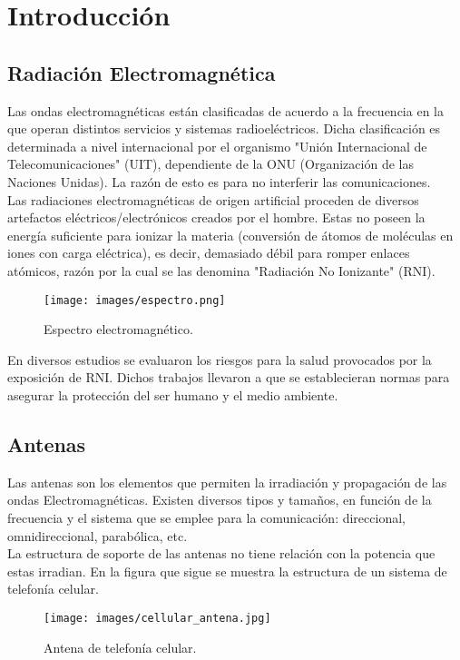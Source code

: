 \section{Introducción}

\subsection{Radiación Electromagnética}
Las ondas electromagnéticas están clasificadas de acuerdo a la frecuencia en la que operan distintos servicios y sistemas radioeléctricos. Dicha clasificación es determinada a nivel internacional por el organismo "Unión Internacional de Telecomunicaciones" (UIT), dependiente de la ONU (Organización de las Naciones Unidas). La razón de esto es para no interferir las comunicaciones. \\

Las radiaciones electromagnéticas de origen artificial proceden de diversos artefactos eléctricos/electrónicos creados por el hombre. Estas no poseen la energía suficiente para ionizar la materia (conversión de átomos de moléculas
en iones con carga eléctrica), es decir, demasiado débil para romper enlaces atómicos, razón por la cual se las denomina "Radiación No Ionizante" (RNI).

\begin{figure}[H]
\centering
\texttt{[image: images/espectro.png]}
\caption{Espectro electromagnético.}
\label{1.0}
\end{figure}

En diversos estudios se evaluaron los riesgos para la salud provocados por la exposición de RNI. Dichos trabajos llevaron a que se establecieran normas para asegurar la protección del ser humano y el medio ambiente.

\subsection{Antenas}
Las antenas son los elementos que permiten la irradiación y propagación de las ondas Electromagnéticas. Existen diversos tipos y tamaños, en función de la frecuencia y el sistema que se emplee para la comunicación: direccional, omnidireccional, parabólica, etc.\\

La estructura de soporte de las antenas no tiene relación con la potencia que estas irradian. En la figura que sigue se muestra la estructura de un sistema de telefonía celular.

\begin{figure}[H]
\centering
\texttt{[image: images/cellular\_antena.jpg]}
\caption{Antena de telefonía celular.}
\label{1.1}
\end{figure}

